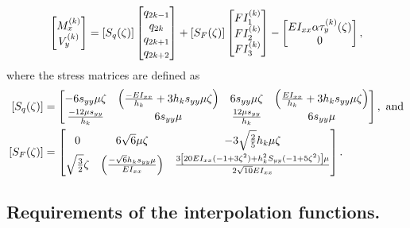 \documentclass{AeroStructure-ERJohnson}
\begin{document}
\begin{align}\label{eq17.110}
\left[\begin{array}{@{}c@{}}M_{x}^{(k)} \\V_{y}^{(k)}\end{array}\right]=\left[S_{q}(\zeta)\right]\left[\begin{array}{@{}c@{}}q_{2 k-1} \\q_{2 k} \\q_{2 k+1} \\q_{2 k+2}\end{array}\right]+\left[S_{F}(\zeta)\right]\left[\begin{array}{@{}l@{}}F I_{1}^{(k)} \\F I_{2}^{(k)} \\F I_{3}^{(k)}\end{array}\right]-\left[\begin{array}{@{}c@{}}E I_{x x} \alpha \tau_{y}^{(k)}(\zeta) \\0\end{array}\right],
\end{align}
where the stress matrices are defined as
\begin{align}
\left[S_{q}(\zeta)\right]&=
\left[\begin{array}{@{}cccc@{}}
-6 s_{y y} \mu \zeta & \left(\frac{-E I_{x x}}{h_{k}}+3 h_{k} s_{y y} \mu \zeta\right) & 6 s_{y y} \mu \zeta & \left(\frac{E I_{x x}}{h_{k}}+3 h_{k} s_{y y} \mu \zeta\right) \\
\frac{-12 \mu s_{y y}}{h_{k}} & 6 s_{y y} \mu & \frac{12 \mu s_{y y}}{h_{k}} & 6 s_{y y} \mu
\end{array}\right], \textrm{ and}\label{eq17.111}\\
\left[S_{F}(\zeta)\right]&=\left[\begin{array}{@{}ccc@{}}
0 & 6 \sqrt{6} \mu \zeta & -3 \sqrt{\frac{2}{5}} h_{k} \mu \zeta \\[5pt]
\sqrt{\frac{3}{2}} \zeta & \left(\frac{-\sqrt{6} h_{k} s_{y y} \mu}{E I_{x x}}\right) & \frac{3\left[20EI_{xx}(-1+3\zeta^2) + h^2_kS_{yy}(-1+5\zeta^2)\right]\mu}{2\sqrt{10}EI_{xx}}
\end{array}\right].\label{eq17.112}
\end{align}


\subsection{Requirements of the interpolation functions.}\label{sec17.3.5}
\end{document}

